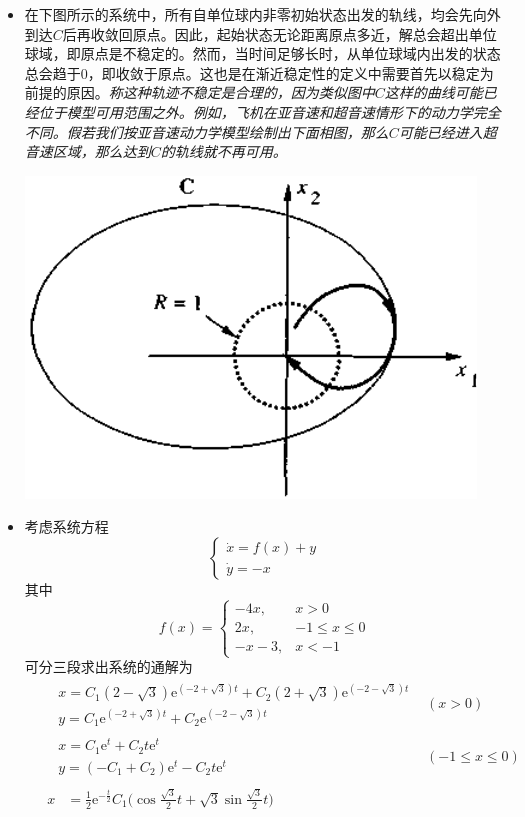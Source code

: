 \begin{example}[稳定与不稳定的图示]
\begin{itemize}[leftmargin=1em]
\begin{center}
    \end{center}
    \item 在下图所示的系统中，所有自单位球内非零初始状态出发的轨线，均会先向外到达$C$后再收敛回原点。因此，起始状态无论距离原点多近，解总会超出单位球域，即原点是不稳定的。然而，当时间足够长时，从单位球域内出发的状态总会趋于$0$，即收敛于原点。这也是在渐近稳定性的定义中需要首先以稳定为前提的原因。{\it 称这种轨迹不稳定是合理的，因为类似图中$C$这样的曲线可能已经位于模型可用范围之外。例如，飞机在亚音速和超音速情形下的动力学完全不同。假若我们按亚音速动力学模型绘制出下面相图，那么$C$可能已经进入超音速区域，那么达到$C$的轨线就不再可用。}
    \begin{center}
      \includegraphics[width=0.35\linewidth]{figure/nonlinear/unstable.png}
    \end{center}
    \item 考虑系统方程\[\begin{cases}
      \dot{x}=f(x)+y\\\dot{y}=-x
    \end{cases}\]
    其中\[
      f(x)=\begin{cases}-4x,&x>0\\2x,&-1\le x\le 0\\-x-3,&x<-1
    \end{cases}\]
    可分三段求出系统的通解为
    \begin{align*}
      &\begin{aligned}&x=C_{1}(2-\sqrt{3})\mathrm{e}^{(-2+\sqrt{3})t}+C_{2}(2+\sqrt{3})\mathrm{e}^{(-2-\sqrt{3})t}\\&y=C_{1}\mathrm{e}^{(-2+\sqrt{3})t}+C_{2}\mathrm{e}^{(-2-\sqrt{3})t}\end{aligned}&(x>0)\\
      &\begin{aligned}&x=C_{1}\mathrm{e}^{t}+C_{2}t\mathrm{e}^{t}\\&y=(-C_{1}+C_2)\mathrm{e}^{t}-C_{2}t\mathrm{e}^{t}\end{aligned}&(-1\le x\le 0)\\
      &\begin{aligned}x&=\frac{1}{2}\mathrm{e}^{-\frac{t}{2}} C_{1}\Big(\cos\frac{\sqrt{3}}{2}t + \sqrt{3} \sin\frac{\sqrt{3}}{2}t\Big)

\end{aligned}
\end{align*}
\end{itemize}
\end{example}
